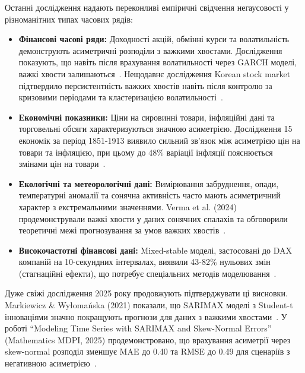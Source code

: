 \documentclass[12pt,a4paper]{article}
\begin{document}
	Останні дослідження надають переконливі емпіричні свідчення негаусовості у різноманітних типах часових рядів:
	
	\begin{itemize}
		\item \textbf{Фінансові часові ряди:} Доходності акцій, обмінні курси та волатильність демонструють асиметричні розподіли з важкими хвостами. Дослідження показують, що навіть після врахування волатильності через GARCH моделі, важкі хвости залишаються~\cite{viswanathan2003quantifying,kim2012approximation}. Нещодавнє дослідження Korean stock market підтвердило персистентність важких хвостів навіть після контролю за кризовими періодами та кластеризацією волатильності~\cite{kim2019fat}.
		
		\item \textbf{Економічні показники:} Ціни на сировинні товари, інфляційні дані та торговельні обсяги характеризуються значною асиметрією. Дослідження 15 економік за період 1851-1913 виявило сильний зв'язок між асиметрією цін на товари та інфляцією, при цьому до 48\% варіації інфляції пояснюється змінами цін на товари~\cite{jacks2024commodity}.
		
		\item \textbf{Екологічні та метеорологічні дані:} Вимірювання забруднення, опади, температурні аномалії та сонячна активність часто мають асиметричний характер з екстремальними значеннями. Verma et al. (2024) продемонстрували важкі хвости у даних сонячних спалахів та обговорили теоретичні межі прогнозування за умов важких хвостів~\cite{verma2024optimal}.
		
		\item \textbf{Високочастотні фінансові дані:} Mixed-stable моделі, застосовані до DAX компаній на 10-секундних інтервалах, виявили 43-82\% нульових змін (стагнаційні ефекти), що потребує спеціальних методів моделювання~\cite{slezak2023application,dedomenico2023modeling}.
	\end{itemize}
	
	Дуже свіжі дослідження 2025 року продовжують підтверджувати ці висновки. Markiewicz \& Wyłomańska (2021) показали, що SARIMAX моделі з Student-t інноваціями значно покращують прогнози для даних з важкими хвостами~\cite{markiewicz2021time}. У роботі ``Modeling Time Series with SARIMAX and Skew-Normal Errors'' (Mathematics MDPI, 2025) продемонстровано, що врахування асиметрії через skew-normal розподіл зменшує MAE до 0.40 та RMSE до 0.49 для сценаріїв з негативною асиметрією~\cite{saraiva2025modeling}.
	
\end{document}
